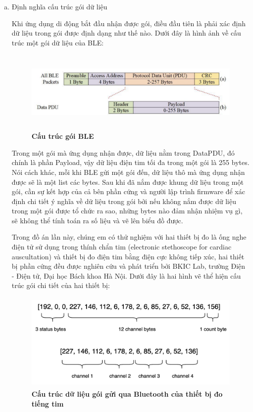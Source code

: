 \begin{enumerate} [a)]
  \item Định nghĩa cấu trúc gói dữ liệu

    Khi ứng dụng di động bắt đầu nhận được gói, điều đầu tiên là phải xác định dữ liệu trong gói được định dạng như thế nào.
    Dưới đây là hình ảnh về cấu trúc một gói dữ liệu của BLE:
    \begin{figure}[H]
      \centering
      \includegraphics[width=14cm,height=4cm]{Images/mobile_app/ecg_calculation/preview_packet.png}
      \caption[Cấu trúc gói BLE]{\bfseries \fontsize{12pt}{0pt}
      \selectfont Cấu trúc gói BLE}
      \label{preview_packet} %
    \end{figure}
    Trong một gói mà ứng dụng nhận được, dữ liệu nằm trong DataPDU, đó chính là phần Payload, vậy dữ liệu điện tim tối đa
    trong một gói là 255 bytes. Nói cách khác, mỗi khi BLE gửi một gói đến, dữ liệu thô mà ứng dụng nhận được sẽ là một
    list các bytes. Sau khi đã nắm được khung dữ liệu trong một gói, cần sự kết hợp của cả bên phần cứng 
    và người lập trình firmware để xác định chi tiết ý nghĩa về dữ liệu trong gói bởi nếu không nắm được dữ liệu
    trong một gói được tổ chức ra sao, những bytes nào đảm nhận nhiệm vụ gì, sẽ không thể tính toán ra số liệu và vẽ lên biểu
    đồ được.
    
    Trong đồ án lần này, chúng em có thử nghiệm với hai thiết bị đo là ống nghe điện tử sử dụng trong thính chẩn tim (electronic stethoscope for cardiac auscultation)
    và thiết bị đo điện tim bằng điện cực không tiếp xúc, hai thiết bị phần cứng đều được nghiên cứu và phát triển bởi BKIC Lab, trường Điện - Điện tử,
    Đại học Bách khoa Hà Nội. Dưới đây là hai hình vẽ thể hiện cấu trúc gói chi tiết của hai thiết bị:

    \begin{figure}[H]
      \centering
      \includegraphics[width=12cm,height=4.8cm]{Images/mobile_app/ecg_calculation/data_packet_all.png}
      \caption[Cấu trúc dữ liệu gói gửi qua Bluetooth của thiết bị đo tiếng tim]{\bfseries \fontsize{12pt}{0pt}
      \selectfont Cấu trúc dữ liệu gói gửi qua Bluetooth của thiết bị đo tiếng tim}
      \label{data_packet_ecg}
    \end{figure}


\end{enumerate}
